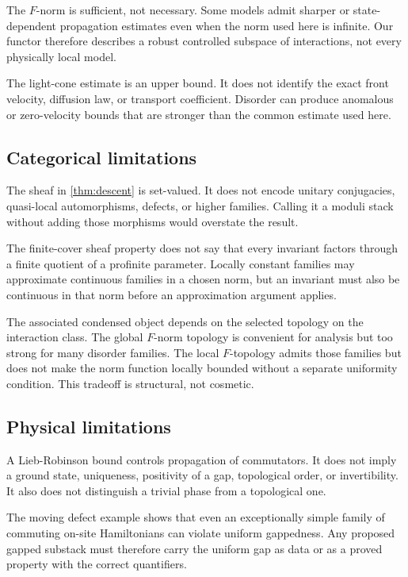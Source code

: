\documentclass[12pt]{article}
\theoremstyle{definition}
\theoremstyle{remark}
\begin{document}
The $F$-norm is sufficient, not necessary.  Some models admit sharper or
state-dependent propagation estimates even when the norm used here is
infinite.  Our functor therefore describes a robust controlled subspace of
interactions, not every physically local model.

The light-cone estimate is an upper bound.  It does not identify the exact
front velocity, diffusion law, or transport coefficient.  Disorder can
produce anomalous or zero-velocity bounds that are stronger than the common
estimate used here.

\subsection{Categorical limitations}

The sheaf in \cref{thm:descent} is set-valued.  It does not encode unitary
conjugacies, quasi-local automorphisms, defects, or higher families.  Calling
it a moduli stack without adding those morphisms would overstate the result.

The finite-cover sheaf property does not say that every invariant factors
through a finite quotient of a profinite parameter.  Locally constant
families may approximate continuous families in a chosen norm, but an
invariant must also be continuous in that norm before an approximation
argument applies.

The associated condensed object depends on the selected topology on the
interaction class.  The global $F$-norm topology is convenient for analysis
but too strong for many disorder families.  The local $F$-topology admits
those families but does not make the norm function locally bounded without a
separate uniformity condition.  This tradeoff is structural, not cosmetic.

\subsection{Physical limitations}

A Lieb-Robinson bound controls propagation of commutators.  It does not imply
a ground state, uniqueness, positivity of a gap, topological order, or
invertibility.  It also does not distinguish a trivial phase from a
topological one.

The moving defect example shows that even an exceptionally simple family of
commuting on-site Hamiltonians can violate uniform gappedness.  Any proposed
gapped substack must therefore carry the uniform gap as data or as a proved
property with the correct quantifiers.
\end{document}
